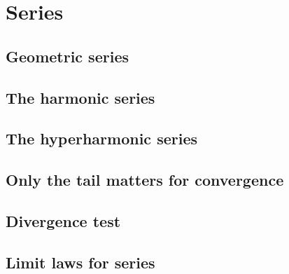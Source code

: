 \section{Series}

\subsection{Geometric series}

\subsection{The harmonic series}

\subsection{The hyperharmonic series}

\subsection{Only the tail matters for convergence}

\subsection{Divergence test}

\subsection{Limit laws for series}
